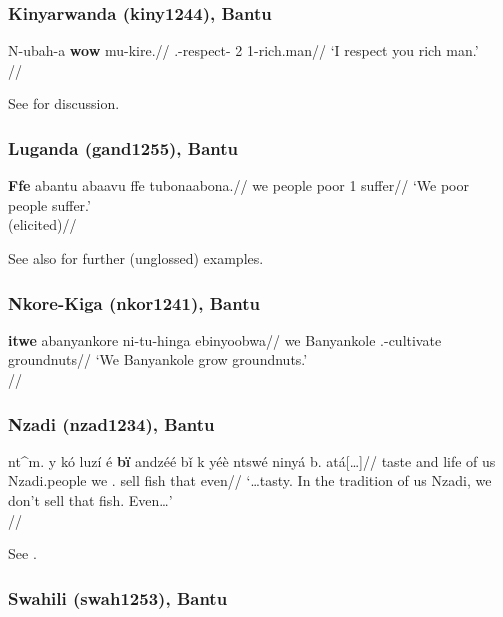 \subsubsection{Kinyarwanda (kiny1244), Bantu}


\ex \begingl
\gla N-ubah-a \textbf{wow} mu-kire.//
\Sg.\Subj-respect-\Fv{} 2\Sg{} \Ncl{}1-rich.man//
\glft `I respect you rich man.' \\\citep[69, (73a)]{vanderwal2022}//
\endgl
\xe

See \citet[67--69]{vanderwal2022} for discussion.

\subsubsection{Luganda (gand1255), Bantu}

\ex \begingl
\gla \textbf{Ffe} abantu abaavu ffe tubonaabona.//
\glb we people poor 1\Pl{} suffer//
\glft `We poor people suffer.'\\(elicited)//
\endgl
\xe 

See also \citet[102]{ashtonetal1954} for further (unglossed) examples.

\newpage

\subsubsection{Nkore-Kiga (nkor1241), Bantu}

\ex 
\begingl
\gla \textbf{itwe} abanyankore ni-tu-hinga ebinyoobwa//
\glb we Banyankole \Prs.\Pl-cultivate groundnuts//
\glft `We Banyankole grow groundnuts.'\\\citep[after][131, (368)]{taylor1985}//
\endgl
\xe 


\subsubsection{Nzadi (nzad1234), Bantu}


\ex \begingl
\gla nt\^{\textschwa}m. y\textepsilon{} kó luzí\ng{} \textdownstep{}é \textbf{b\"{i}} andzéé b\v{i} k yéè ntswé ninyá b\textopeno{}. atá{[\ldots]}//
\glb taste and \Loc{} life of us Nzadi.people we \Neg.\Prs{} sell fish that \Neg{} even//
\glft `\ldots tasty. In the tradition of us Nzadi, we don't sell that fish. Even\ldots' \\\citep[279, (10)]{craneetal2011}//
\endgl
\xe 

See \citet[210, 279]{craneetal2011}.

\subsubsection{Swahili (swah1253), Bantu}


